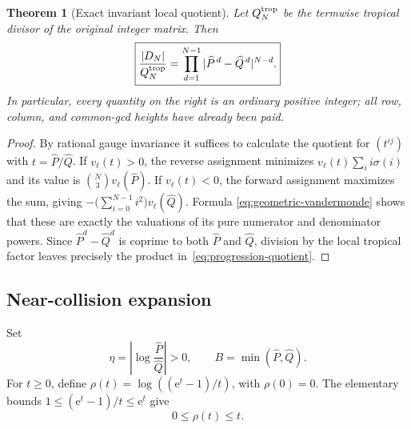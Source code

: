 \documentclass[11pt]{article}
\newcommand{\e}{\mathrm e}
\newcommand{\1}{\mathbf 1}
\theoremstyle{plain}
\newtheorem{theorem}{Theorem}[section]
\theoremstyle{definition}
\theoremstyle{remark}
\begin{document}
\begin{theorem}[Exact invariant local quotient]\label{thm:progression-quotient}
Let $Q_N^{\rm trop}$ be the termwise tropical divisor of the original integer
matrix.  Then
\begin{equation}\label{eq:progression-quotient}
 \boxed{
 \frac{|D_N|}{Q_N^{\rm trop}}
 =\prod_{d=1}^{N-1}
 |\widehat P^{\,d}-\widehat Q^{\,d}|^{N-d}.}
\end{equation}
In particular, every quantity on the right is an ordinary positive integer;
all row, column, and common-gcd heights have already been paid.
\end{theorem}

\begin{proof}
By rational gauge invariance it suffices to calculate the quotient for
$(t^{ij})$ with $t=\widehat P/\widehat Q$.  If
$v_\ell(t)>0$, the reverse assignment minimizes
$v_\ell(t)\sum_i i\sigma(i)$ and its value is
$\binom N3v_\ell(\widehat P)$.  If $v_\ell(t)<0$, the forward assignment
maximizes the sum, giving
$-\bigl(\sum_{i=0}^{N-1}i^2\bigr)v_\ell(\widehat Q)$.  Formula
\eqref{eq:geometric-vandermonde} shows that these are exactly the valuations
of its pure numerator and denominator powers.  Since
$\widehat P^d-\widehat Q^d$ is coprime to both $\widehat P$ and
$\widehat Q$, division by the local tropical factor leaves precisely the
product in~\eqref{eq:progression-quotient}.
\end{proof}

\subsection{Near-collision expansion}

Set
\begin{equation}\label{eq:eta-B}
 \eta=\left|\log\frac{\widehat P}{\widehat Q}\right|>0,
 \qquad B=\min(\widehat P,\widehat Q).
\end{equation}
For $t\ge0$, define
$\rho(t)=\log((\e^t-1)/t)$, with $\rho(0)=0$.  The elementary bounds
$1\le(\e^t-1)/t\le\e^t$ give
\begin{equation}\label{eq:rho-bound}
 0\le\rho(t)\le t.
\end{equation}
\end{document}
